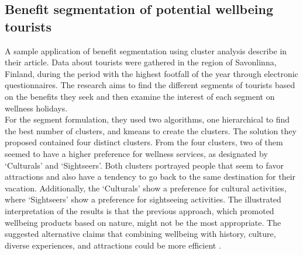 \subsection{Benefit segmentation of potential wellbeing tourists}
A sample application of benefit segmentation using cluster analysis describe \textcite{finland} in their article. Data about tourists were gathered in the region of Savonlinna, Finland, during the period with the highest footfall of the year through electronic questionnaires. The research aims to find the different segments of tourists based on the benefits they seek and then examine the interest of each segment on wellness holidays. \\
For the segment formulation, they used two algorithms, one hierarchical to find the best number of clusters, and kmeans to create the clusters. The solution they proposed contained four distinct clusters. From the four clusters, two of them seemed to have a higher preference for wellness services, as designated by \textcite{finland} `Culturals' and `Sightseers'. Both clusters portrayed people that seem to favor attractions and also have a tendency to go back to the same destination for their vacation. Additionally, the `Culturals' show a preference for cultural activities, where `Sightseers' show a preference for sightseeing activities. The illustrated interpretation of the results is that the previous approach, which promoted wellbeing products based on nature, might not be the most appropriate. The suggested alternative claims that combining wellbeing with history, culture, diverse experiences, and attractions could be more efficient \autocite[308-312]{finland}. \\
